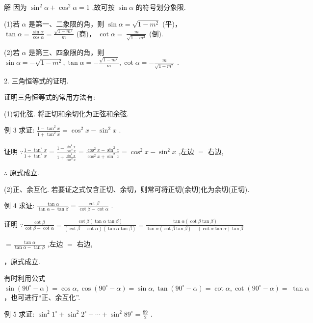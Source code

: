 \documentclass[10pt]{article}
\begin{document}
解 因为 \({\sin }^{2}\alpha  + {\cos }^{2}\alpha  = 1\) ,故可按 \(\sin \alpha\) 的符号划分象限.

(1)若 \(\alpha\) 是第一、二象限的角，则 \(\sin \alpha  = \sqrt{1 - {m}^{2}}\) (平)， \(\tan \alpha  = \frac{\sin \alpha }{\cos \alpha } = \frac{\sqrt{1 - {m}^{2}}}{m}\) (商)， \(\cot \alpha  = \; \frac{m}{\sqrt{1 - {m}^{2}}}\) (倒).

(2)若 \(\alpha\) 是第三、四象限的角，则 \(\sin \alpha  =  - \sqrt{1 - {m}^{2}},\tan \alpha  =  - \frac{\sqrt{1 - {m}^{2}}}{m},\cot \alpha  =  - \frac{m}{\sqrt{1 - {m}^{2}}}\) .

2. 三角恒等式的证明.

证明三角恒等式的常用方法有:

(1)切化弦. 将正切和余切化为正弦和余弦.

例 3 求证: \(\frac{1 - {\tan }^{2}x}{1 + {\tan }^{2}x} = {\cos }^{2}x - {\sin }^{2}x\) .

证明 \(\because \frac{1 - {\tan }^{2}x}{1 + {\tan }^{2}x} = \frac{1 - \frac{{\sin }^{2}x}{{\cos }^{2}x}}{1 + \frac{{\sin }^{2}x}{{\cos }^{2}x}} = \frac{{\cos }^{2}x - {\sin }^{2}x}{{\cos }^{2}x + {\sin }^{2}x} = {\cos }^{2}x - {\sin }^{2}x\) ,左边 \(=\) 右边,

\(\therefore\) 原式成立.

(2)正、余互化. 若要证之式仅含正切、余切，则常可将正切(余切)化为余切(正切).

例 4 求证: \(\frac{\tan \alpha }{\tan \alpha  - \tan \beta } = \frac{\cot \beta }{\cot \beta  - \cot \alpha }\) .

证明 \(\because \frac{\cot \beta }{\cot \beta  - \cot \alpha } = \frac{\cot \beta \left( {\tan \alpha \tan \beta }\right) }{\left( {\cot \beta  - \cot \alpha }\right) \left( {\tan \alpha \tan \beta }\right) } = \frac{\tan \alpha \left( {\cot \beta \tan \beta }\right) }{\tan \alpha \left( {\cot \beta \tan \beta }\right)  - \left( {\cot \alpha \tan \alpha }\right) \tan \beta }\)

\(= \frac{\tan \alpha }{\tan \alpha  - \tan \beta }\) ,左边 \(=\) 右边,

，原式成立.

有时利用公式 \(\sin \left( {{90}^{ \circ  } - \alpha }\right)  = \cos \alpha ,\cos \left( {{90}^{ \circ  } - \alpha }\right)  = \sin \alpha ,\tan \left( {{90}^{ \circ  } - \alpha }\right)  = \cot \alpha ,\cot \left( {{90}^{ \circ  } - \alpha }\right)  = \; \tan \alpha\) ，也可进行“正、余互化”.

例 5 求证: \({\sin }^{2}{1}^{ \circ  } + {\sin }^{2}{2}^{ \circ  } + \cdots  + {\sin }^{2}{89}^{ \circ  } = \frac{89}{2}\) .
\end{document}
